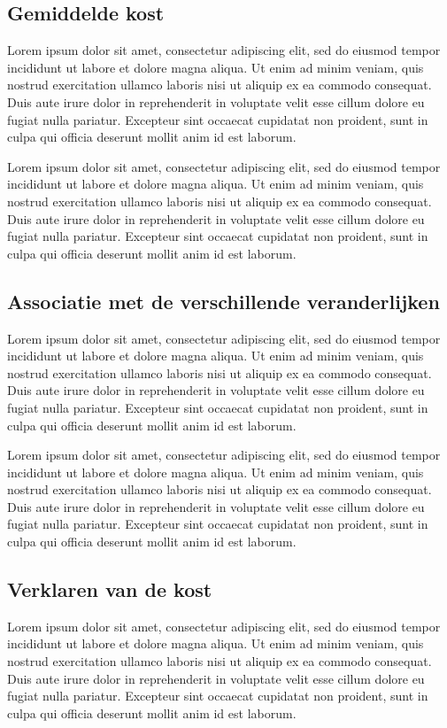 \documentclass[a4paper]{kulakarticle}
\begin{document}
	\subsection{Gemiddelde kost}
	Lorem ipsum dolor sit amet, consectetur adipiscing elit, sed do eiusmod tempor incididunt ut labore et dolore magna aliqua. Ut enim ad minim veniam, quis nostrud exercitation ullamco laboris nisi ut aliquip ex ea commodo consequat. Duis aute irure dolor in reprehenderit in voluptate velit esse cillum dolore eu fugiat nulla pariatur. Excepteur sint occaecat cupidatat non proident, sunt in culpa qui officia deserunt mollit anim id est laborum.
	
	Lorem ipsum dolor sit amet, consectetur adipiscing elit, sed do eiusmod tempor incididunt ut labore et dolore magna aliqua. Ut enim ad minim veniam, quis nostrud exercitation ullamco laboris nisi ut aliquip ex ea commodo consequat. Duis aute irure dolor in reprehenderit in voluptate velit esse cillum dolore eu fugiat nulla pariatur. Excepteur sint occaecat cupidatat non proident, sunt in culpa qui officia deserunt mollit anim id est laborum.
	\subsection{Associatie met de verschillende veranderlijken}
	Lorem ipsum dolor sit amet, consectetur adipiscing elit, sed do eiusmod tempor incididunt ut labore et dolore magna aliqua. Ut enim ad minim veniam, quis nostrud exercitation ullamco laboris nisi ut aliquip ex ea commodo consequat. Duis aute irure dolor in reprehenderit in voluptate velit esse cillum dolore eu fugiat nulla pariatur. Excepteur sint occaecat cupidatat non proident, sunt in culpa qui officia deserunt mollit anim id est laborum.
	
	Lorem ipsum dolor sit amet, consectetur adipiscing elit, sed do eiusmod tempor incididunt ut labore et dolore magna aliqua. Ut enim ad minim veniam, quis nostrud exercitation ullamco laboris nisi ut aliquip ex ea commodo consequat. Duis aute irure dolor in reprehenderit in voluptate velit esse cillum dolore eu fugiat nulla pariatur. Excepteur sint occaecat cupidatat non proident, sunt in culpa qui officia deserunt mollit anim id est laborum.
	
	\subsection{Verklaren van de kost}
	Lorem ipsum dolor sit amet, consectetur adipiscing elit, sed do eiusmod tempor incididunt ut labore et dolore magna aliqua. Ut enim ad minim veniam, quis nostrud exercitation ullamco laboris nisi ut aliquip ex ea commodo consequat. Duis aute irure dolor in reprehenderit in voluptate velit esse cillum dolore eu fugiat nulla pariatur. Excepteur sint occaecat cupidatat non proident, sunt in culpa qui officia deserunt mollit anim id est laborum.
	
\end{document}
